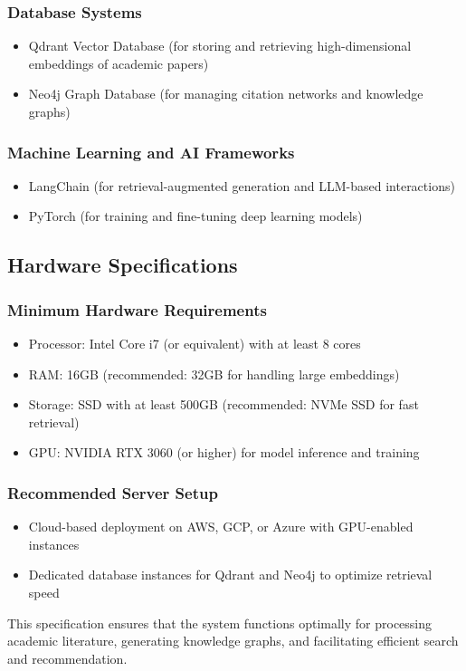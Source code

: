\documentclass[a4paper,12pt]{article}
\begin{document}
\subsubsection{Database Systems}
\begin{itemize}
    \item Qdrant Vector Database (for storing and retrieving high-dimensional embeddings of academic papers)
    \vspace{-10pt}
    \item Neo4j Graph Database (for managing citation networks and knowledge graphs)
\end{itemize}

\subsubsection{Machine Learning and AI Frameworks}
\begin{itemize}
    \item LangChain (for retrieval-augmented generation and LLM-based interactions)
    \vspace{-10pt}
    \item PyTorch (for training and fine-tuning deep learning models)
\end{itemize}

\subsection{Hardware Specifications}
\subsubsection{Minimum Hardware Requirements}
\begin{itemize}
    \item Processor: Intel Core i7 (or equivalent) with at least 8 cores
    \vspace{-10pt}
    \item RAM: 16GB (recommended: 32GB for handling large embeddings)
    \vspace{-10pt}
    \item Storage: SSD with at least 500GB (recommended: NVMe SSD for fast retrieval)
    \vspace{-10pt}
    \item GPU: NVIDIA RTX 3060 (or higher) for model inference and training
\end{itemize}

\subsubsection{Recommended Server Setup}
\begin{itemize}
    \item Cloud-based deployment on AWS, GCP, or Azure with GPU-enabled instances
    \vspace{-10pt}
    \item Dedicated database instances for Qdrant and Neo4j to optimize retrieval speed
\end{itemize}
This specification ensures that the system functions optimally for processing academic
literature, generating knowledge graphs, and facilitating efficient search and
recommendation.
\newpage
\end{document}

